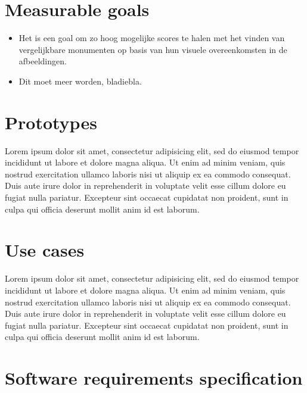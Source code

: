 \documentclass{article}
\begin{document}
\section{Measurable goals}
\begin{itemize}
\item Het is een goal om zo hoog mogelijke scores te halen met het vinden van vergelijkbare monumenten op basis van hun visuele overeenkomsten in de afbeeldingen.
\item Dit moet meer worden, bladiebla.
\end{itemize}
\section{Prototypes}
Lorem ipsum dolor sit amet, consectetur adipisicing elit, sed do eiusmod tempor incididunt ut labore et dolore magna aliqua. Ut enim ad minim veniam, quis nostrud exercitation ullamco laboris nisi ut aliquip ex ea commodo consequat. Duis aute irure dolor in reprehenderit in voluptate velit esse cillum dolore eu fugiat nulla pariatur. Excepteur sint occaecat cupidatat non proident, sunt in culpa qui officia deserunt mollit anim id est laborum.
\section{Use cases}
Lorem ipsum dolor sit amet, consectetur adipisicing elit, sed do eiusmod tempor incididunt ut labore et dolore magna aliqua. Ut enim ad minim veniam, quis nostrud exercitation ullamco laboris nisi ut aliquip ex ea commodo consequat. Duis aute irure dolor in reprehenderit in voluptate velit esse cillum dolore eu fugiat nulla pariatur. Excepteur sint occaecat cupidatat non proident, sunt in culpa qui officia deserunt mollit anim id est laborum.
\section{Software requirements specification}
\end{document}

